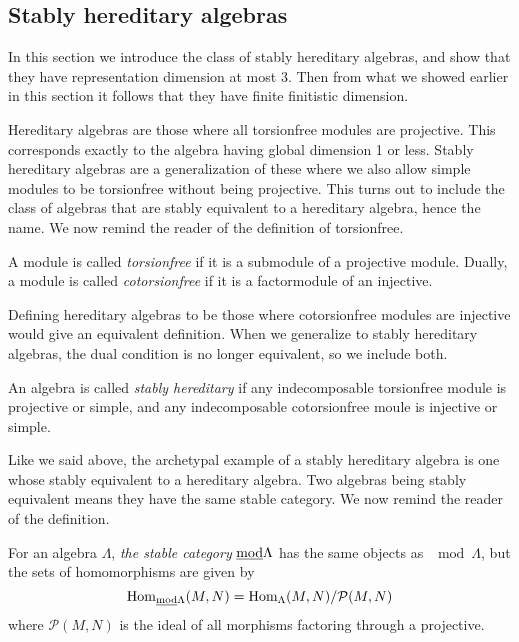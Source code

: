 \subsection{Stably hereditary algebras}\label{sec:stable_hereditary_algebras}

In this section we introduce the class of stably hereditary algebras, and show that they have representation dimension at most 3. Then from what we showed earlier in this section it follows that they have finite finitistic dimension.

Hereditary algebras are those where all torsionfree modules are projective. This corresponds exactly to the algebra having global dimension 1 or less. Stably hereditary algebras are a generalization of these where we also allow simple modules to be torsionfree without being projective. This turns out to include the class of algebras that are stably equivalent to a hereditary algebra, hence the name. We now remind the reader of the definition of torsionfree. 

\begin{defn}[(co)torsionfree]
	A module is called \emph{torsionfree} if it is a submodule of a projective module. Dually, a module is called \emph{cotorsionfree} if it is a factormodule of an injective.
\end{defn}

Defining hereditary algebras to be those where cotorsionfree modules are injective would give an equivalent definition. When we generalize to stably hereditary algebras, the dual condition is no longer equivalent, so we include both.

\begin{defn}
	An algebra is called \emph{stably hereditary} if any indecomposable torsionfree module is projective or simple, and any indecomposable cotorsionfree moule is injective or simple. 
\end{defn}

Like we said above, the archetypal example of a stably hereditary algebra is one whose stably equivalent to a hereditary algebra. Two algebras being stably equivalent means they have the same stable category. We now remind the reader of the definition.

\begin{defn}
	For an algebra $\Lambda$, \emph{the stable category} $\underline{\mod}\Lambda$ has the same objects as $\mod\Lambda$, but the sets of homomorphisms are given by $$\Hom_{\underline{\mod}\Lambda}(M, N) = \Hom_\Lambda(M,N)/\mathcal{P}(M,N)$$
	where $\mathcal{P}(M,N)$ is the ideal of all morphisms factoring through a projective.
\end{defn}

